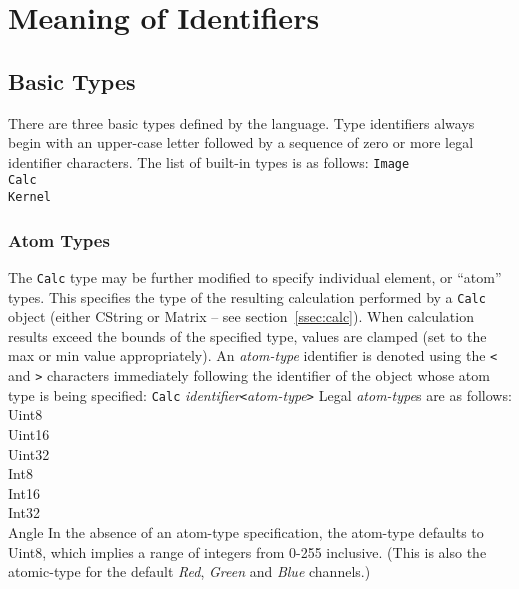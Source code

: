 \section{Meaning of Identifiers}
\label{sec:identmeaning}

\subsection{Basic Types}
\label{ssec:types}
There are three basic types defined by the \sys{} language.
Type identifiers always begin with an upper-case letter followed by a sequence
of zero or more legal identifier characters. The list of built-in types is as follows:
\startsyn
\texttt{Image} \\
\texttt{Calc} \\
\texttt{Kernel}
\stopsyn 

\subsubsection{Atom Types}
\label{sssec:atomtypes}
The \texttt{Calc} type may be further modified
to specify individual element, or ``atom'' types. This specifies the type
of the resulting calculation performed by a \texttt{Calc} object (either CString or Matrix --
see section~\ref{ssec:calc}). When calculation results exceed the bounds of the specified type,
values are clamped (set to the max or min value appropriately).
An \emph{atom-type} identifier is denoted using the \texttt{<} and \texttt{>}
characters immediately following the identifier of the object whose atom type
is being specified:
\startsyn
\texttt{Calc} \emph{identifier}\texttt{<}\emph{atom-type}\texttt{>}
\stopsyn
Legal \emph{atom-type}s are as follows:
\startsyn
Uint8 \\
Uint16 \\
Uint32 \\
Int8 \\
Int16 \\
Int32 \\
Angle
\stopsyn
In the absence of an atom-type specification, the atom-type defaults to Uint8,
which implies a range of integers from 0-255 inclusive. (This is also the atomic-type
for the default \emph{Red}, \emph{Green} and \emph{Blue} channels.)

